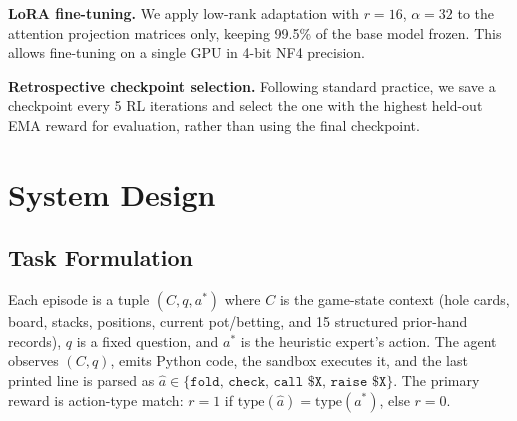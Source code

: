\documentclass{article}
\begin{document}
\textbf{LoRA fine-tuning.}
We apply low-rank adaptation \citep{hu2022} with $r{=}16$, $\alpha{=}32$
to the attention projection matrices only, keeping 99.5\% of the base
model frozen.  This allows fine-tuning on a single GPU in 4-bit NF4
precision.

\textbf{Retrospective checkpoint selection.}
Following standard practice, we save a checkpoint every 5 RL iterations
and select the one with the highest held-out EMA reward for evaluation,
rather than using the final checkpoint.

\section{System Design}

\subsection{Task Formulation}

Each episode is a tuple $(C, q, a^*)$ where $C$ is the game-state context
(hole cards, board, stacks, positions, current pot/betting, and 15
structured prior-hand records), $q$ is a fixed question, and $a^*$ is
the heuristic expert's action.
The agent observes $(C, q)$, emits Python code, the sandbox executes it,
and the last printed line is parsed as
$\hat{a} \in \{\texttt{fold},\,\texttt{check},\,\texttt{call \$X},\,
\texttt{raise \$X}\}$.
The primary reward is action-type match: $r{=}1$ if
$\mathrm{type}(\hat{a}) = \mathrm{type}(a^*)$, else $r{=}0$.
\end{document}
